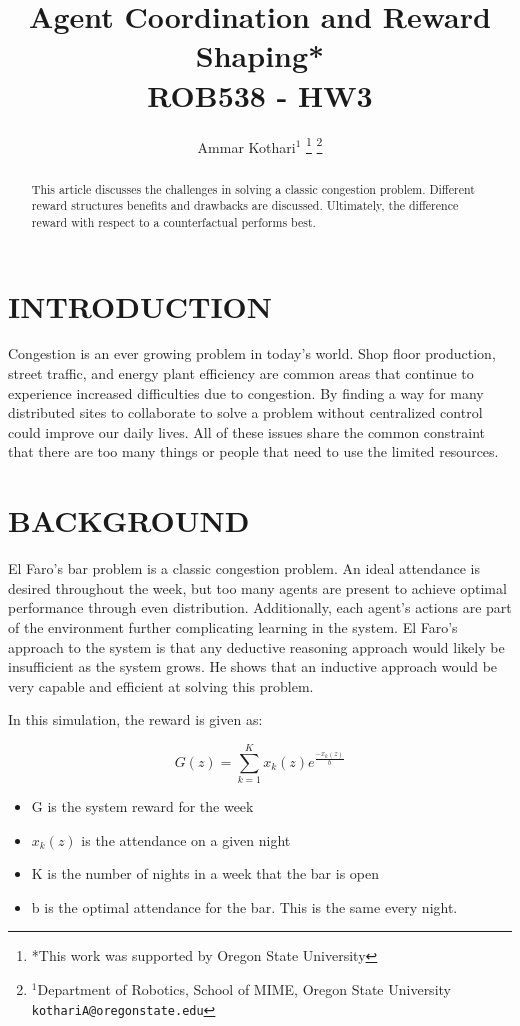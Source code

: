 \documentclass[letterpaper, 10 pt, conference]{ieeeconf}
\title{\LARGE \bf
Agent Coordination and Reward Shaping* \\
ROB538 - HW3
}
\author{Ammar Kothari$^{1}$
\thanks{*This work was supported by Oregon State University}%
\thanks{$^{1}$Department of Robotics, School of MIME, Oregon State University
        {\tt\small kothariA@oregonstate.edu}}%
}
\begin{document}
\maketitle
\thispagestyle{empty}
\pagestyle{empty}


\begin{abstract}
\label{sec:abstract}
This article discusses the challenges in solving a classic congestion problem.  Different reward structures benefits and drawbacks are discussed.  Ultimately, the difference reward with respect to a counterfactual performs best.  

\end{abstract}


\section{INTRODUCTION}
\label{sec:intro}

Congestion is an ever growing problem in today's world.  Shop floor production, street traffic, and energy plant efficiency are common areas that continue to experience increased difficulties due to congestion.  By finding a way for many distributed sites to collaborate to solve a problem without centralized control could improve our daily lives.  All of these issues share the common constraint that there are too many things or people that need to use the limited resources.


\section{BACKGROUND}
\label{sec:background}
El Faro's bar problem is a classic congestion problem.  An ideal attendance is desired throughout the week, but too many agents are present to achieve optimal performance through even distribution.  Additionally, each agent's actions are part of the environment further complicating learning in the system.  El Faro's approach to the system is that any deductive reasoning approach would likely be insufficient as the system grows.  He shows that an inductive approach would be very capable and efficient at solving this problem.

In this simulation, the reward is given as:

\begin{equation}
    G(z) = \displaystyle\sum_{k=1}^{K} x_{k}(z)e^{\frac{-x_{k}(z)}{b}}
\end{equation}
\begin{itemize}
    \item G is the system reward for the week
    \item $x_{k}(z)$ is the attendance on a given night
    \item K is the number of nights in a week that the bar is open
    \item b is the optimal attendance for the bar.  This is the same every night.
\end{itemize}
\end{document}
